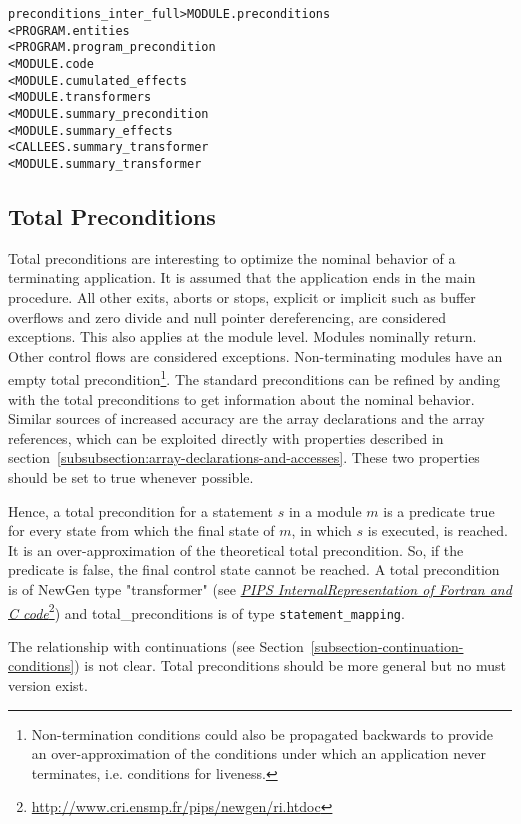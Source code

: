 \documentclass[a4paper]{report}
\newenvironment{PipsMake}{\begin{alltt}}{\end{alltt}}
\newenvironment{PipsPass}[1]{\label{pass:#1}}{}
\newcommand{\LINK}[2]{\href{#2}{#1}\footnote{\url{#2}}\xspace}
\newcommand{\Pri}{\LINK{\emph{PIPS Internal\space{}Representation of
      Fortran and C code}}{http://www.cri.ensmp.fr/pips/newgen/ri.htdoc}}
\begin{document}
\begin{PipsMake}
preconditions_inter_full        > MODULE.preconditions
        < PROGRAM.entities
        < PROGRAM.program_precondition
        < MODULE.code
        < MODULE.cumulated_effects
        < MODULE.transformers
        < MODULE.summary_precondition
        < MODULE.summary_effects
        < CALLEES.summary_transformer
        < MODULE.summary_transformer

\end{PipsMake}

\subsection{Total Preconditions}
\label{subsubsection-ototal-preconditions}

\begin{PipsPass}{total preconditions}
Total preconditions are interesting to optimize the nominal behavior
of a terminating application. It is assumed that the application ends
in the main procedure. All other exits, aborts or stops, explicit or
implicit such as buffer overflows and zero divide and null pointer
dereferencing, are considered exceptions. This also applies at the
module level. Modules nominally return. Other control flows are
considered exceptions. Non-terminating modules have an empty total
precondition\footnote{Non-termination conditions could also be
  propagated backwards to provide an over-approximation of the
  conditions under which an application never terminates,
  i.e. conditions for liveness.}. The standard preconditions can be
refined by anding with the total preconditions to get information
about the nominal behavior. Similar sources of increased accuracy are
the array declarations and the array references, which can be
exploited directly with properties described in
section~\ref{subsubsection:array-declarations-and-accesses}. These two
properties should be set to true whenever possible.

Hence, a total precondition for a statement $s$ in a module $m$ is a predicate true
for every state from which the final state of $m$, in which $s$
is executed, is reached. It is an over-approximation of the theoretical
total precondition. So, if the predicate is false, the final control state
cannot be reached. A total precondition is of NewGen type "transformer" (see
\Pri{}) and total\_preconditions is of type \verb+statement_mapping+.

The relationship with continuations (see
Section~\ref{subsection-continuation-conditions}) is not clear. Total
preconditions should be more general but no must version exist.


\end{PipsPass}
\end{document}
